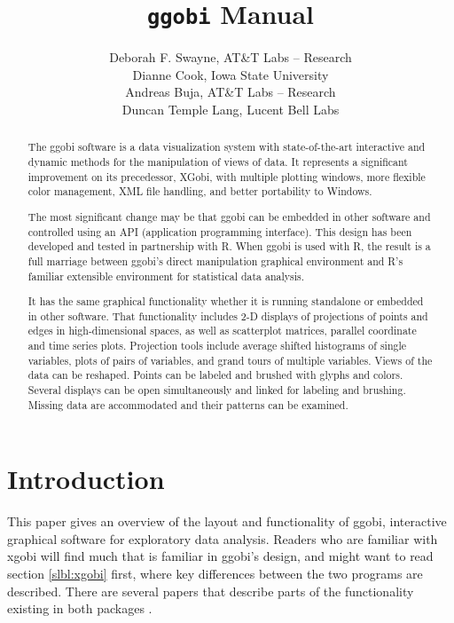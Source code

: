 \documentclass[11pt]{article}
\begin{document}
\title {{\tt ggobi} Manual}
\author{
Deborah F. Swayne, AT\&T Labs -- Research \\
Dianne Cook, Iowa State University \\
Andreas Buja, AT\&T Labs -- Research \\
Duncan Temple Lang, Lucent Bell Labs
}
\date{}

\maketitle

\begin{abstract}

The ggobi software is a data visualization system with state-of-the-art
interactive and dynamic methods for the manipulation of views of
data.  It represents a significant improvement on its precedessor, XGobi,
with multiple plotting windows, more flexible color management, XML file
handling, and better portability to Windows.

The most significant change may be that ggobi can be embedded in other
software and controlled using an API (application programming
interface).  This design has been developed and tested in partnership
with R.  When ggobi is used with R, the result is a full marriage
between ggobi's direct manipulation graphical environment and R's
familiar extensible environment for statistical data analysis.

It has the same graphical functionality whether it is running
standalone or embedded in other software.  That functionality
includes 2-D displays of projections of points and edges in
high-dimensional spaces, as well as scatterplot matrices, parallel
coordinate and time series plots.  Projection tools include average
shifted histograms of single variables, plots of pairs of variables,
and grand tours of multiple variables.  Views of the data can be
reshaped.  Points can be labeled and brushed with glyphs and colors.
Several displays can be open simultaneously and linked for labeling
and brushing.  Missing data are accommodated and their patterns can
be examined.
\end{abstract}

\section{Introduction}

This paper gives an overview of the layout and functionality of ggobi,
interactive graphical software for exploratory data analysis.  Readers
who are familiar with xgobi will find much that is familiar in ggobi's
design, and might want to read section \ref{slbl:xgobi} first, where
key differences between the two programs are described. There are
several papers that describe parts of the functionality existing in
both packages
\cite{BCS95,SCB97,SB98,BAHM88,CBC93,CBCH95,CB95,BCAH95c}.
\end{document}
